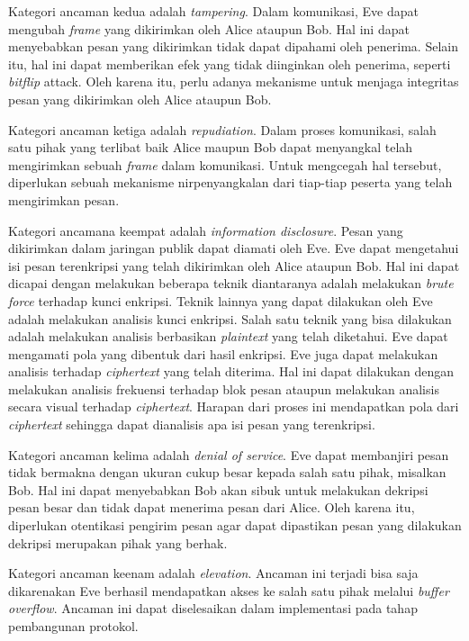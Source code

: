 Kategori ancaman kedua adalah \emph{tampering}. Dalam komunikasi, Eve dapat mengubah \emph{frame} yang dikirimkan oleh Alice ataupun Bob. Hal ini dapat menyebabkan pesan yang dikirimkan tidak dapat dipahami oleh penerima. Selain itu, hal ini dapat memberikan efek yang tidak diinginkan oleh penerima, seperti \emph{bitflip} attack. Oleh karena itu, perlu adanya mekanisme untuk menjaga integritas pesan yang dikirimkan oleh Alice ataupun Bob.

Kategori ancaman ketiga adalah \emph{repudiation}. Dalam proses komunikasi, salah satu pihak yang terlibat baik Alice maupun Bob dapat menyangkal telah mengirimkan sebuah \emph{frame} dalam komunikasi. Untuk mengcegah hal tersebut, diperlukan sebuah mekanisme nirpenyangkalan dari tiap-tiap peserta yang telah mengirimkan pesan.

Kategori ancamana keempat adalah \emph{information disclosure}. Pesan yang dikirimkan dalam jaringan publik dapat diamati oleh Eve. Eve dapat mengetahui isi pesan terenkripsi yang telah dikirimkan oleh Alice ataupun Bob. Hal ini dapat dicapai dengan melakukan beberapa teknik diantaranya adalah melakukan \emph{brute force} terhadap kunci enkripsi. Teknik lainnya yang dapat dilakukan oleh Eve adalah melakukan analisis kunci enkripsi. Salah satu teknik yang bisa dilakukan adalah melakukan analisis berbasikan \emph{plaintext} yang telah diketahui. Eve dapat mengamati pola yang dibentuk dari hasil enkripsi. Eve juga dapat melakukan analisis terhadap \emph{ciphertext} yang telah diterima. Hal ini dapat dilakukan dengan melakukan analisis frekuensi terhadap blok pesan ataupun melakukan analisis secara visual terhadap \emph{ciphertext}. Harapan dari proses ini mendapatkan pola dari \emph{ciphertext} sehingga dapat dianalisis apa isi pesan yang terenkripsi. %

Kategori ancaman kelima adalah \emph{denial of service}. Eve dapat membanjiri pesan tidak bermakna dengan ukuran cukup besar kepada salah satu pihak, misalkan Bob. Hal ini dapat menyebabkan Bob akan sibuk untuk melakukan dekripsi pesan besar dan tidak dapat menerima pesan dari Alice. Oleh karena itu, diperlukan otentikasi pengirim pesan agar dapat dipastikan pesan yang dilakukan dekripsi merupakan pihak yang berhak.

Kategori ancaman keenam adalah \emph{elevation}. Ancaman ini terjadi bisa saja dikarenakan Eve berhasil mendapatkan akses ke salah satu pihak melalui \emph{buffer overflow}. Ancaman ini dapat diselesaikan dalam implementasi pada tahap pembangunan protokol. 


